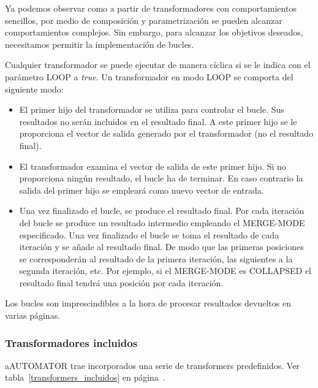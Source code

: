 Ya podemos observar como a partir de transformadores con
comportamientos sencillos, por medio de composición y parametrización
se pueden alcanzar comportamientos complejos. Sin embargo, para
alcanzar los objetivos deseados, necesitamos permitir la
implementación de bucles.

Cualquier transformador se puede ejecutar de manera cíclica si se le
indica con el parámetro LOOP a \emph{true}. Un transformador en modo
LOOP se comporta del siguiente modo:

\begin{itemize}
  \item El primer hijo del transformador se utiliza para controlar el
    bucle. Sus resultados no serán incluidos en el resultado final. A
    este primer hijo se le proporciona el vector de salida generado
    por el transformador (no el resultado final).
  \item El transformador examina el vector de salida de este primer
    hijo. Si no proporciona ningún resultado, el bucle ha de
    terminar. En caso contrario la salida del primer hijo se empleará
    como nuevo vector de entrada.
  \item Una vez finalizado el bucle, se produce el resultado
    final. Por cada iteración del bucle se produce un resultado
    intermedio empleando el MERGE-MODE especificado. Una vez
    finalizado el bucle se toma el resultado de cada iteración y se
    añade al resultado final. De modo que las primeras posiciones se
    corresponderán al resultado de la primera iteración, las
    siguientes a la segunda iteración, etc. Por ejemplo, si el
    MERGE-MODE es COLLAPSED el resultado final tendrá una posición por
    cada iteración.
\end{itemize}

Los bucles son imprescindibles a la hora de procesar resultados
devueltos en varias páginas.

\subsubsection{Transformadores incluidos}

aAUTOMATOR trae incorporados una serie de transformers
predefinidos. Ver tabla~\ref{transformers_incluidos} en
página~\pageref{transformers_incluidos}.

